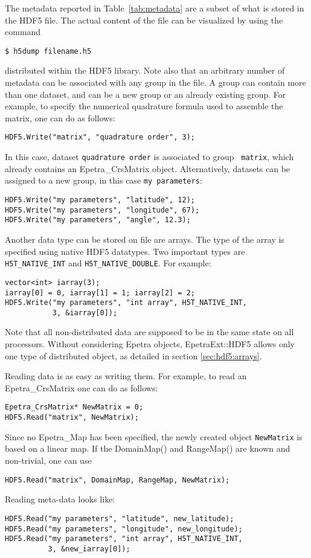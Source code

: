 \documentclass[11pt,relax]{SANDreport}
\begin{document}
The metadata reported in Table~\ref{tab:metadata} are a subset of what is
stored in the HDF5 file. The actual content of the file can be visualized by
using the command
\begin{verbatim}
$ h5dump filename.h5
\end{verbatim}
distributed within the HDF5 library. Note also that an arbitrary number of
metadata can be associated with any group in the file.  A group can contain
more than one dataset, and can be a new group or an already existing group.
For example, to specify the numerical quadrature formula used to assemble the
matrix, one can do as follows:
\begin{verbatim}
HDF5.Write("matrix", "quadrature order", 3);
\end{verbatim}
In this case, dataset {\tt quadrature order} is associated to group {\tt
  matrix}, which already contains an Epetra\_CrsMatrix object. 
Alternatively, datasets can be assigned to a new group, in this case
{\tt my parameters}:
\begin{verbatim}
HDF5.Write("my parameters", "latitude", 12);
HDF5.Write("my parameters", "longitude", 67);
HDF5.Write("my parameters", "angle", 12.3);
\end{verbatim}
Another data type can be stored on file are arrays. The type of the array is
specified using native HDF5 datatypes. Two important types are {\tt
  H5T\_NATIVE\_INT} and {\tt H5T\_NATIVE\_DOUBLE}. For example:
\begin{verbatim}
vector<int> iarray(3); 
iarray[0] = 0, iarray[1] = 1; iarray[2] = 2;
HDF5.Write("my parameters", "int array", H5T_NATIVE_INT, 
           3, &iarray[0]);
\end{verbatim}
Note that all non-distributed data are supposed to be in the same state on all
processors. Without considering Epetra objects, EpetraExt::HDF5 allows only
one type of distributed object, as detailed in section \ref{sec:hdf5:arrays}.

\smallskip

Reading data is as easy as writing them. For example, to read an
Epetra\_CrsMatrix one can do as follows:
\begin{verbatim}
Epetra_CrsMatrix* NewMatrix = 0;
HDF5.Read("matrix", NewMatrix);
\end{verbatim}
Since no Epetra\_Map has been specified, 
the newly created object {\tt NewMatrix} is based on a linear map. If the DomainMap() and RangeMap() are
known and non-trivial, one can use
\begin{verbatim}
HDF5.Read("matrix", DomainMap, RangeMap, NewMatrix);
\end{verbatim}
Reading meta-data looks like:
\begin{verbatim}
HDF5.Read("my parameters", "latitude", new_latitude);
HDF5.Read("my parameters", "longitude", new_longitude);
HDF5.Read("my parameters", "int array", H5T_NATIVE_INT, 
          3, &new_iarray[0]);
\end{verbatim}
\end{document}
